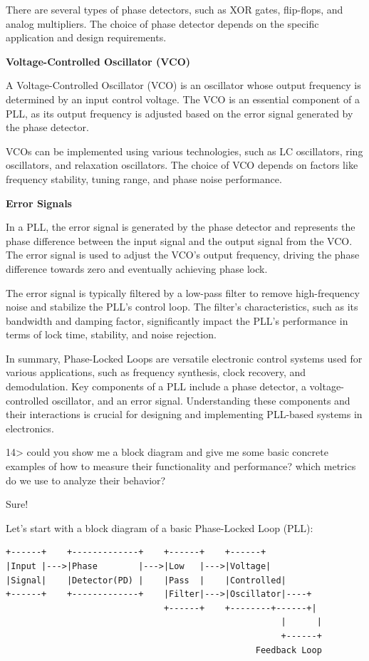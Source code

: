 \documentclass[
]{article}
\begin{document}
There are several types of phase detectors, such as XOR gates,
flip-flops, and analog multipliers. The choice of phase detector depends
on the specific application and design requirements.

\textbf{Voltage-Controlled Oscillator (VCO)}

A Voltage-Controlled Oscillator (VCO) is an oscillator whose output
frequency is determined by an input control voltage. The VCO is an
essential component of a PLL, as its output frequency is adjusted based
on the error signal generated by the phase detector.

VCOs can be implemented using various technologies, such as LC
oscillators, ring oscillators, and relaxation oscillators. The choice of
VCO depends on factors like frequency stability, tuning range, and phase
noise performance.

\textbf{Error Signals}

In a PLL, the error signal is generated by the phase detector and
represents the phase difference between the input signal and the output
signal from the VCO. The error signal is used to adjust the VCO's output
frequency, driving the phase difference towards zero and eventually
achieving phase lock.

The error signal is typically filtered by a low-pass filter to remove
high-frequency noise and stabilize the PLL's control loop. The filter's
characteristics, such as its bandwidth and damping factor, significantly
impact the PLL's performance in terms of lock time, stability, and noise
rejection.

In summary, Phase-Locked Loops are versatile electronic control systems
used for various applications, such as frequency synthesis, clock
recovery, and demodulation. Key components of a PLL include a phase
detector, a voltage-controlled oscillator, and an error signal.
Understanding these components and their interactions is crucial for
designing and implementing PLL-based systems in electronics.

14\textgreater{} could you show me a block diagram and give me some
basic concrete examples of how to measure their functionality and
performance? which metrics do we use to analyze their behavior?

Sure!

Let's start with a block diagram of a basic Phase-Locked Loop (PLL):

\begin{verbatim}
+------+    +-------------+    +------+    +------+
|Input |--->|Phase        |--->|Low   |--->|Voltage|
|Signal|    |Detector(PD) |    |Pass  |    |Controlled|
+------+    +-------------+    |Filter|--->|Oscillator|----+
                               +------+    +--------+------+|
                                                      |      |
                                                      +------+
                                                 Feedback Loop
\end{verbatim}
\end{document}
